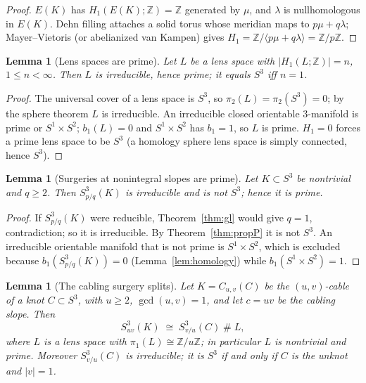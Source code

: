\documentclass[11pt]{article}
\newtheorem{lemma}[theorem]{Lemma}
\theoremstyle{definition}
\theoremstyle{remark}
\newcommand{\Z}{\mathbb{Z}}
\begin{document}
\begin{proof}
$E(K)$ has $H_1(E(K);\Z)=\Z$ generated by $\mu$, and $\lambda$ is
nullhomologous in $E(K)$.  Dehn filling attaches a solid torus whose meridian
maps to $p\mu+q\lambda$; Mayer--Vietoris (or abelianized van Kampen) gives
$H_1=\Z/\langle p\mu+q\lambda\rangle=\Z/p\Z$.
\end{proof}

\begin{lemma}[Lens spaces are prime]\label{lem:lensprime}
Let $L$ be a lens space with $|H_1(L;\Z)|=n$, $1\le n<\infty$.  Then $L$ is
irreducible, hence prime; it equals $S^3$ iff $n=1$.
\end{lemma}

\begin{proof}
The universal cover of a lens space is $S^3$, so $\pi_2(L)=\pi_2(S^3)=0$; by
the sphere theorem $L$ is irreducible.  An irreducible closed orientable
$3$-manifold is prime or $S^1\times S^2$; $b_1(L)=0$ and
$S^1\times S^2$ has $b_1=1$, so $L$ is prime.  $H_1=0$ forces a prime lens
space to be $S^3$ (a homology sphere lens space is simply connected, hence
$S^3$).
\end{proof}

\begin{lemma}[Surgeries at nonintegral slopes are prime]\label{lem:nonintegral}
Let $K\subset S^3$ be nontrivial and $q\ge 2$.  Then $S^3_{p/q}(K)$ is
irreducible and is not $S^3$; hence it is prime.
\end{lemma}

\begin{proof}
If $S^3_{p/q}(K)$ were reducible, Theorem~\ref{thm:gl} would give $q=1$,
contradiction; so it is irreducible.  By Theorem~\ref{thm:propP} it is not
$S^3$.  An irreducible orientable manifold that is not prime is
$S^1\times S^2$, which is excluded because $b_1(S^3_{p/q}(K))=0$
(Lemma~\ref{lem:homology}) while $b_1(S^1\times S^2)=1$.
\end{proof}

\begin{lemma}[The cabling surgery splits]\label{lem:cablesplit}
Let $K=C_{u,v}(C)$ be the $(u,v)$-cable of a knot $C\subset S^3$, with
$u\ge 2$, $\gcd(u,v)=1$, and let $c=uv$ be the cabling slope.  Then
\[
S^{3}_{uv}(K)\;\cong\;S^{3}_{v/u}(C)\;\#\;L,
\]
where $L$ is a lens space with $\pi_1(L)\cong \Z/u\Z$; in particular $L$ is
nontrivial and prime.  Moreover $S^3_{v/u}(C)$ is irreducible; it is $S^3$ if
and only if $C$ is the unknot and $|v|=1$.
\end{lemma}
\end{document}

